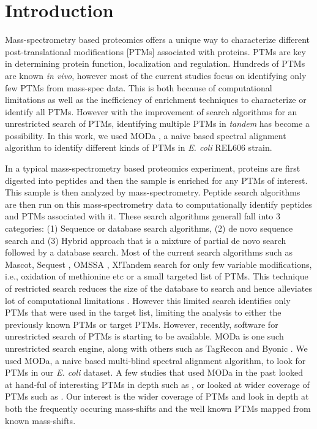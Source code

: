 \documentclass[12pt]{article}
\begin{document}

\section{Introduction}

Mass-spectrometry based proteomics \cite{Lamondetal2012} offers a unique way to characterize different post-translational modifications [PTMs] associated with proteins. PTMs are key in determining protein function, localization and regulation. Hundreds of PTMs are known \emph{in vivo}, however most of the current studies focus on identifying only few PTMs from mass-spec data. This is both because of computational limitations as well as the inefficiency of enrichment techniques to characterize or identify all PTMs. However with the improvement of search algorithms for an unrestricted search of PTMs, identifying multiple PTMs in \emph{tandem} has become a possibility. In this work, we used MODa \cite{Naetal2012}, a naive based spectral alignment algorithm to identify different kinds of PTMs in \emph{E. coli} REL606 strain.

In a typical mass-spectrometry based proteomics experiment, proteins are first digested into peptides and then the sample is enriched for any PTMs of interest. This sample is then analyzed by mass-spectrometry. Peptide search algorithms are then run on this mass-spectrometry data to computationally identify peptides and PTMs associated with it. These search algorithms generall fall into 3 categories: (1) Sequence or database search algorithms, (2) de novo sequence search and (3) Hybrid approach that is a mixture of partial de novo search followed by a database search. Most of the current search algorithms such as Mascot\cite{Perkinsetal1999}, Sequest \cite{Engetal1994}, OMSSA \cite{Geeretal2004}, X!Tandem \cite{CraigBeavis2004} search for only few variable modifications, i.e., oxidation of methionine etc or a small targeted list of PTMs. This technique of restricted search reduces the size of the database to search and hence alleviates lot of computational limitations \cite{McHughArthur2008}. However this limited search identifies only PTMs that were used in the target list, limiting the analysis to either the previously known PTMs or target PTMs. However, recently, software for unrestricted search of PTMs is starting to be available. MODa \cite{Naetal2012} is one such unrestricted search engine, along with others such as TagRecon\cite{Dasarietal2010} and Byonic \cite{Bernetal2012}. We used MODa, a naive based multi-blind spectral alignment algorithm, to look for PTMs in our \emph{E. coli} dataset. A few studies that used MODa in the past looked at hand-ful of interesting PTMs in depth such as \cite{Kimetal2014}, or looked at wider coverage of PTMs such as \cite{Liuetal2013}. Our interest is the wider coverage of PTMs and look in depth at both the frequently occuring mass-shifts and the well known PTMs mapped from known mass-shifts. 
\end{document}
